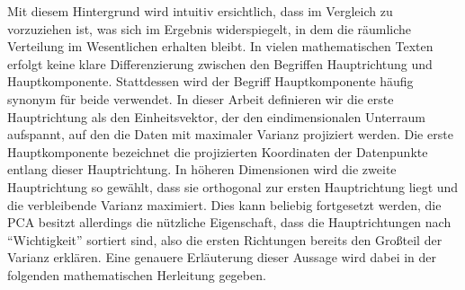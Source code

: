 Mit diesem Hintergrund wird intuitiv ersichtlich, dass  im Vergleich zu  vorzuziehen ist, was sich im Ergebnis widerspiegelt, in dem die räumliche Verteilung im Wesentlichen erhalten bleibt.
\enlargethispage{\baselineskip} 
In vielen mathematischen Texten erfolgt keine klare Differenzierung zwischen den Begriffen Hauptrichtung und Hauptkomponente.
Stattdessen wird der Begriff Hauptkomponente häufig synonym für beide verwendet.
In dieser Arbeit definieren wir die erste Hauptrichtung als den Einheitsvektor, der den eindimensionalen Unterraum aufspannt, auf den die Daten mit maximaler Varianz projiziert werden.
Die erste Hauptkomponente bezeichnet die projizierten Koordinaten der Datenpunkte entlang dieser Hauptrichtung.
In höheren Dimensionen wird die zweite Hauptrichtung so gewählt, dass sie orthogonal zur ersten Hauptrichtung liegt und die verbleibende Varianz maximiert.
Dies kann beliebig fortgesetzt werden, die PCA besitzt allerdings die nützliche Eigenschaft, dass die Hauptrichtungen nach \enquote{Wichtigkeit} sortiert sind, also die ersten Richtungen bereits den Großteil der Varianz erklären.
Eine genauere Erläuterung dieser Aussage wird dabei in der folgenden mathematischen Herleitung gegeben.


